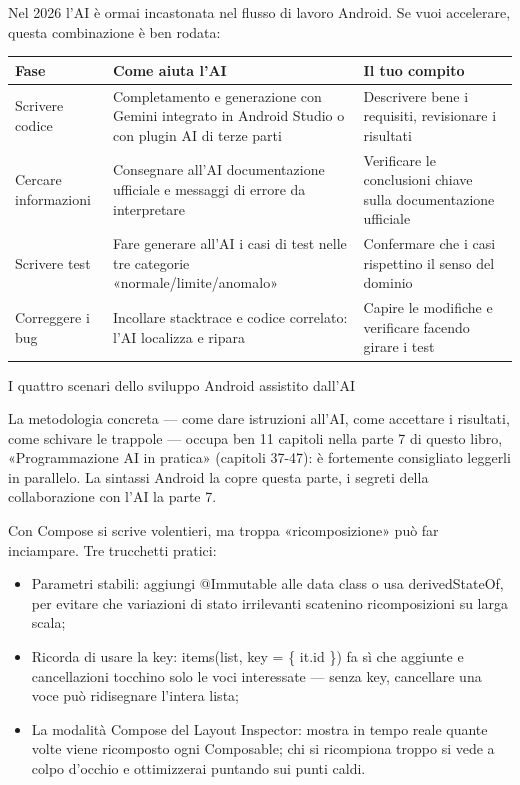 
Nel 2026 l'AI è ormai incastonata nel flusso di lavoro Android. Se vuoi accelerare, questa combinazione è ben rodata:

\begin{center}
\begin{tabularx}{\linewidth}{|X|X|X|}
\hline
\textbf{Fase} & \textbf{Come aiuta l'AI} & \textbf{Il tuo compito} \tabularnewline
\hline
Scrivere codice & Completamento e generazione con Gemini integrato in Android Studio o con plugin AI di terze parti & Descrivere bene i requisiti, revisionare i risultati \tabularnewline
Cercare informazioni & Consegnare all'AI documentazione ufficiale e messaggi di errore da interpretare & Verificare le conclusioni chiave sulla documentazione ufficiale \tabularnewline
Scrivere test & Fare generare all'AI i casi di test nelle tre categorie «normale/limite/anomalo» & Confermare che i casi rispettino il senso del dominio \tabularnewline
Correggere i bug & Incollare stacktrace e codice correlato: l'AI localizza e ripara & Capire le modifiche e verificare facendo girare i test \tabularnewline
\hline
\end{tabularx}
\end{center}

\begin{center}\small\color{gray}I quattro scenari dello sviluppo Android assistito dall'AI\end{center}

La metodologia concreta — come dare istruzioni all'AI, come accettare i risultati, come schivare le trappole — occupa ben 11 capitoli nella parte 7 di questo libro, «Programmazione AI in pratica» (capitoli 37-47): è fortemente consigliato leggerli in parallelo. La sintassi Android la copre questa parte, i segreti della collaborazione con l'AI la parte 7.


Con Compose si scrive volentieri, ma troppa «ricomposizione» può far inciampare. Tre trucchetti pratici:

\begin{itemize}
  \item Parametri stabili: aggiungi @Immutable alle data class o usa derivedStateOf, per evitare che variazioni di stato irrilevanti scatenino ricomposizioni su larga scala;
  \item Ricorda di usare la key: items(list, key = \{ it.id \}) fa sì che aggiunte e cancellazioni tocchino solo le voci interessate — senza key, cancellare una voce può ridisegnare l'intera lista;
  \item La modalità Compose del Layout Inspector: mostra in tempo reale quante volte viene ricomposto ogni Composable; chi si ricompiona troppo si vede a colpo d'occhio e ottimizzerai puntando sui punti caldi.
\end{itemize}

